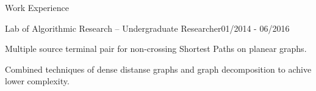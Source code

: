 \documentclass{resume} %
\begin{document}
\begin{rSection}{Work Experience}


\begin{rSubsection}{Lab of Algorithmic Research -- Undergraduate Researcher}{01/2014 - 06/2016}{}{}%
\item Multiple source terminal pair for non-crossing Shortest Paths on planear graphs.
\item Combined techniques of dense distanse graphs and graph decomposition to achive lower complexity.
\end{rSubsection}

\end{rSection}
\end{document}
